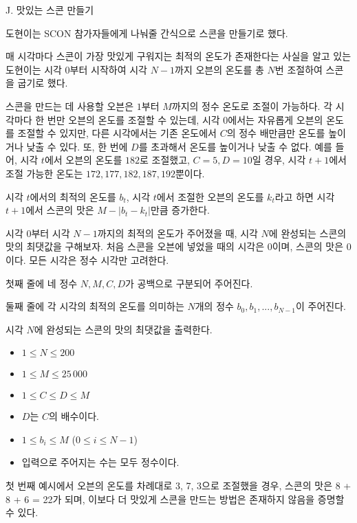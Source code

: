 \def\probtitle{맛있는 스콘 만들기}
\def\probno{J} %

\begin{problem}{\probno{}. \probtitle{}}

도현이는 SCON 참가자들에게 나눠줄 간식으로 스콘을 만들기로 했다.  

매 시각마다 스콘이 가장 맛있게 구워지는 최적의 온도가 존재한다는 사실을 알고 있는 도현이는 시각 $0$부터 시작하여 시각 $N-1$까지 오븐의 온도를 총 $N$번 조절하여 스콘을 굽기로 했다.

스콘을 만드는 데 사용할 오븐은 $1$부터 $M$까지의 정수 온도로 조절이 가능하다.  
각 시각마다 한 번만 오븐의 온도를 조절할 수 있는데, 시각 $0$에서는 자유롭게 오븐의 온도를 조절할 수 있지만, 다른 시각에서는 기존 온도에서 $C$의 정수 배만큼만 온도를 높이거나 낮출 수 있다. 또, 한 번에 $D$를 초과해서 온도를 높이거나 낮출 수 없다. 예를 들어, 시각 $t$에서 오븐의 온도를 $182$로 조절했고, $C=5, D=10$일 경우, 시각 $t+1$에서 조절 가능한 온도는 $172, 177, 182, 187, 192$뿐이다.  

시각 $t$에서의 최적의 온도를 $b_t$, 시각 $t$에서 조절한 오븐의 온도를 $k_t$라고 하면 시각 $t+1$에서 스콘의 맛은 $M - |b_t - k_t|$만큼 증가한다. 

시각 $0$부터 시각 $N-1$까지의 최적의 온도가 주어졌을 때, 시각 $N$에 완성되는 스콘의 맛의 최댓값을 구해보자. 처음 스콘을 오븐에 넣었을 때의 시각은 $0$이며, 스콘의 맛은 $0$이다. 모든 시각은 정수 시각만 고려한다.

\InputFile
첫째 줄에 네 정수 $N, M, C, D$가 공백으로 구분되어 주어진다.

둘째 줄에 각 시각의 최적의 온도를 의미하는 $N$개의 정수 $b_0, b_1, ... , b_{N-1}$이 주어진다.

\OutputFile

시각 $N$에 완성되는 스콘의 맛의 최댓값을 출력한다.

\Constraints

\begin{itemize}[topsep=0pt,noitemsep]
    \item $1 \leq N \leq 200$
    \item $1 \leq M \leq 25\,000$
    \item $1 \leq C \leq D \leq M$
    \item $D$는 $C$의 배수이다.
    \item $1 \le b_i \le M$ ($0 \le i \le N-1$)
    \item 입력으로 주어지는 수는 모두 정수이다.
\end{itemize}

\Examples

\begin{example}
%
%
\end{example}

\Note
첫 번째 예시에서 오븐의 온도를 차례대로 3, 7, 3으로 조절했을 경우, 스콘의 맛은 8 + 8 + 6 = 22가 되며, 이보다 더 맛있게 스콘을 만드는 방법은 존재하지 않음을 증명할 수 있다.

\end{problem}